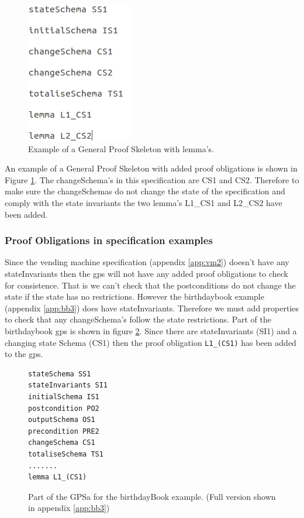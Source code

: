 \begin{figure}[H]
\centering
\includegraphics[scale=0.5]{Figures/skeleton/proofskeletonwithpo.png}
\caption{Example of a General Proof Skeleton with lemma's.}
\label{fig:gpswithpo}
\end{figure}

An example of a General Proof Skeleton with added proof obligations is shown in
Figure \ref{fig:gpswithpo}. The changeSchema's in this specification are CS1 and
CS2. Therefore to make sure the changeSchemas do not change the state of the
specification and comply with the state invariants the two lemma's L1\_CS1 and
L2\_CS2 have been added.

\subsubsection{Proof Obligations in specification examples}
Since the vending machine specification (appendix \ref{app:vm2}) doesn't have
any stateInvariants then the \gls{gps} will not have any added proof
obligations to check for consistence. That is we can't check that the
postconditions do not change the state if the state has no restrictions. However
the birthdaybook example (appendix \ref{app:bb3}) does have stateInvariants.
Therefore we must add properties to check that any changeSchema's follow the
state restrictions. Part of the birthdaybook \gls{gps} is shown in figure
\ref{fig:bbgps}. Since there are stateInvariants (SI1) and a changing state
Schema (CS1) then the proof obligation \texttt{L1\_(CS1)} has been added to the
\gls{gps}.

\begin{figure}[H]
\begin{verbatim}
stateSchema SS1 
stateInvariants SI1 
initialSchema IS1 
postcondition PO2 
outputSchema OS1 
precondition PRE2 
changeSchema CS1 
totaliseSchema TS1 
.......
lemma L1_(CS1) 
\end{verbatim}
\caption{Part of the GPSa for the birthdayBook example. (Full version shown in appendix \ref{app:bb3}) \label{fig:bbgps}}
\end{figure}

